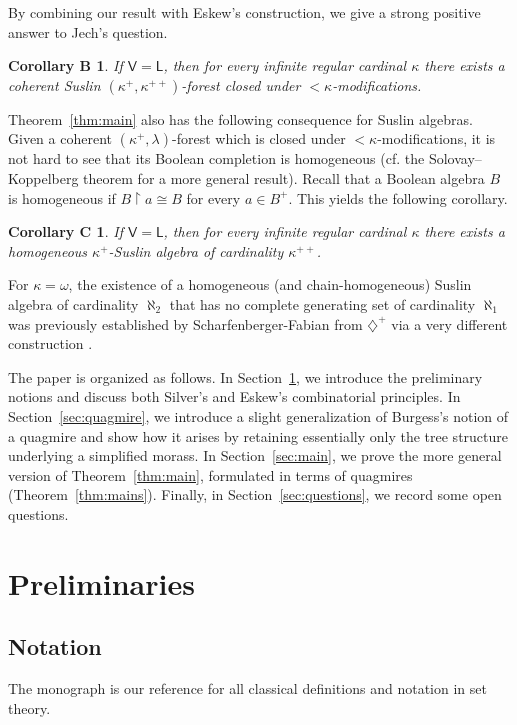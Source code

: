 \documentclass[]{amsart}
\newtheorem*{maincorollary1}{Corollary B}
\newtheorem*{maincorollary2}{Corollary C}
\theoremstyle{definition}
\theoremstyle{remark}
\begin{document}
By combining our result with Eskew's construction, we give a strong positive answer to Jech's question.

\begin{maincorollary1}
If $\mathsf{V = L}$, then for every infinite regular cardinal $\kappa$ there exists a coherent Suslin $(\kappa^+, \kappa^{++})$-forest closed under ${<}\kappa$-modifications.
\end{maincorollary1}

Theorem~\ref{thm:main} also has the following consequence for Suslin algebras. Given a coherent $(\kappa^+, \lambda)$-forest which is closed under ${<}\kappa$-modifications, it is not hard to see that its Boolean completion is homogeneous (cf. the Solovay–Koppelberg theorem \cite[Theorem 18.4.1]{MR991595} for a more general result). Recall that a Boolean algebra $B$ is homogeneous if $B \upharpoonright a \cong B$ for every $a \in B^+$. This yields the following corollary.
\begin{maincorollary2}
If $\mathsf{V = L}$, then for every infinite regular cardinal $\kappa$ there exists a homogeneous $\kappa^+$-Suslin algebra of cardinality $\kappa^{++}$.
\end{maincorollary2}
For $\kappa = \omega$, the existence of a homogeneous (and chain-homogeneous) Suslin algebra of cardinality $\aleph_2$ that has no complete generating set of cardinality $\aleph_1$ was previously established by Scharfenberger-Fabian from $\diamondsuit^+$ via a very different construction \cite{MR2853724}.

The paper is organized as follows. In Section~\ref{sec:prel}, we introduce the preliminary notions and discuss both Silver's and Eskew's combinatorial principles.  In Section~\ref{sec:quagmire}, we introduce a slight generalization of Burgess’s notion of a quagmire and show how it arises by retaining essentially only the tree structure underlying a simplified morass. In Section~\ref{sec:main}, we prove the more general version of Theorem~\ref{thm:main}, formulated in terms of quagmires (Theorem~\ref{thm:mains}). Finally, in Section~\ref{sec:questions}, we record some open questions.

\section{Preliminaries}\label{sec:prel}


\subsection{Notation}
The monograph \cite{MR1940513} is our reference for all classical definitions and notation in set theory.
\end{document}
